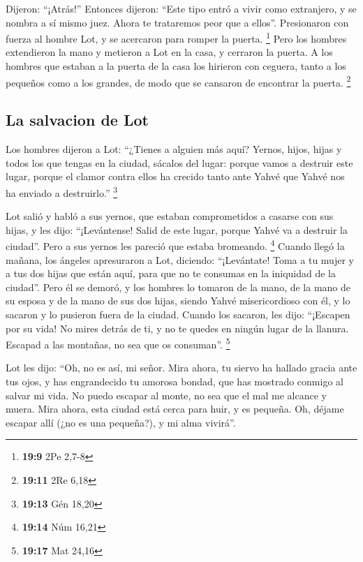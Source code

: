  Dijeron: ``¡Atrás!'' Entonces dijeron: ``Este tipo entró
a vivir como extranjero, y se nombra a sí mismo juez. Ahora te
trataremos peor que a ellos''. Presionaron con fuerza al hombre Lot, y
se acercaron para romper la puerta. \footnote{\textbf{19:9} 2Pe 2,7-8}
 Pero los hombres extendieron la mano y metieron a Lot en
la casa, y cerraron la puerta.  A los hombres que estaban
a la puerta de la casa los hirieron con ceguera, tanto a los pequeños
como a los grandes, de modo que se cansaron de encontrar la puerta.
\footnote{\textbf{19:11} 2Re 6,18}

\hypertarget{la-salvacion-de-lot}{%
\subsection{La salvacion de Lot}\label{la-salvacion-de-lot}}

 Los hombres dijeron a Lot: ``¿Tienes a alguien más aquí?
Yernos, hijos, hijas y todos los que tengas en la ciudad, sácalos del
lugar:  porque vamos a destruir este lugar, porque el
clamor contra ellos ha crecido tanto ante Yahvé que Yahvé nos ha enviado
a destruirlo.'' \footnote{\textbf{19:13} Gén 18,20}

 Lot salió y habló a sus yernos, que estaban
comprometidos a casarse con sus hijas, y les dijo: ``¡Levántense! Salid
de este lugar, porque Yahvé va a destruir la ciudad''. Pero a sus yernos
les pareció que estaba bromeando. \footnote{\textbf{19:14} Núm 16,21}
 Cuando llegó la mañana, los ángeles apresuraron a Lot,
diciendo: ``¡Levántate! Toma a tu mujer y a tus dos hijas que están
aquí, para que no te consumas en la iniquidad de la ciudad''.
 Pero él se demoró, y los hombres lo tomaron de la mano,
de la mano de su esposa y de la mano de sus dos hijas, siendo Yahvé
misericordioso con él, y lo sacaron y lo pusieron fuera de la ciudad.
 Cuando los sacaron, les dijo: ``¡Escapen por su vida! No
mires detrás de ti, y no te quedes en ningún lugar de la llanura.
Escapad a las montañas, no sea que os consuman''. \footnote{\textbf{19:17}
  Mat 24,16}

 Lot les dijo: ``Oh, no es así, mi señor. 
Mira ahora, tu siervo ha hallado gracia ante tus ojos, y has
engrandecido tu amorosa bondad, que has mostrado conmigo al salvar mi
vida. No puedo escapar al monte, no sea que el mal me alcance y muera.
 Mira ahora, esta ciudad está cerca para huir, y es
pequeña. Oh, déjame escapar allí (¿no es una pequeña?), y mi alma
vivirá''.

